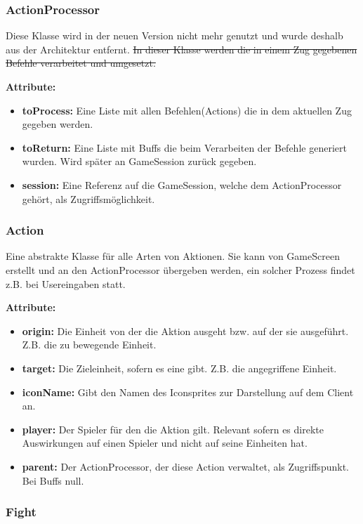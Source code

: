 \documentclass[fontsize=12pt,paper=a4,twoside]{scrartcl}
\begin{document}
\subsubsection{ActionProcessor}
Diese Klasse wird in der neuen Version nicht mehr genutzt und wurde deshalb aus der Architektur entfernt.
\sout{In dieser Klasse werden die in einem Zug gegebenen Befehle verarbeitet und umgesetzt.}

\textbf{Attribute:}
\begin{itemize}
\item \textbf{toProcess:} Eine Liste mit allen Befehlen(Actions) die in dem aktuellen Zug gegeben werden.
\item \textbf{toReturn:} Eine Liste mit Buffs die beim Verarbeiten der Befehle generiert wurden. Wird später an GameSession zurück gegeben.
\item \textbf{session:} Eine Referenz auf die GameSession, welche dem ActionProcessor gehört, als Zugriffsmöglichkeit.
\end{itemize}

\subsubsection{Action}

Eine abstrakte Klasse für alle Arten von Aktionen. Sie kann von GameScreen erstellt und an den ActionProcessor übergeben werden, ein solcher Prozess findet z.B. bei Usereingaben statt.

\textbf{Attribute:}
\begin{itemize}
\item \textbf{origin:} Die Einheit von der die Aktion ausgeht bzw. auf der sie ausgeführt. Z.B. die zu bewegende Einheit.
\item \textbf{target:} Die Zieleinheit, sofern es eine gibt. Z.B. die angegriffene Einheit.
\item \textbf{iconName:} Gibt den Namen des Iconsprites zur Darstellung auf dem Client an.
\item \textbf{player:} Der Spieler für den die Aktion gilt. Relevant sofern es direkte Auswirkungen auf einen Spieler und nicht auf seine Einheiten hat.
\item \textbf{parent:} Der ActionProcessor, der diese Action verwaltet, als Zugriffspunkt. Bei Buffs null.
\end{itemize}

\subsubsection{Fight}
\end{document}
